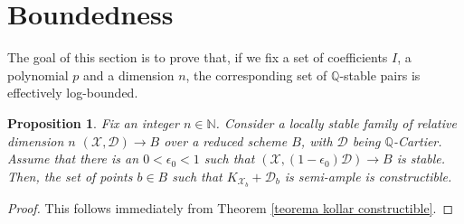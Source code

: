 \documentclass{amsart}
\newcommand{\bQ}{\mathbb{Q}}
\newcommand{\cD}{\mathcal{D}}
\newcommand{\cX}{\mathcal{X}}
\newtheorem{Prop}[theorem]{Proposition}
\theoremstyle{definition}
\begin{document}
\section{Boundedness}\label{section_boundedness}
The goal of this section is to prove that, if we fix a set of coefficients $I$, a polynomial $p$ and a dimension $n$, the corresponding set of $\bQ$-stable pairs is effectively log-bounded. 



\begin{Prop}\label{prop:nef:open}
Fix an integer $n\in \mathbb{N}$.
Consider a locally stable family of relative dimension $n$ $(\cX,\cD)\to B$ over a reduced scheme $B$, with $\cD$ being $\bQ$-Cartier.
Assume that there is an $0<\epsilon_0 < 1$ such that  $(\cX,(1-\epsilon_0)\cD)\to B$ is stable.
Then, the set of points $b\in B$ such that $K_{\cX_b} + \cD_b$ is semi-ample is constructible.
\end{Prop}

\begin{proof}
This follows immediately from Theorem \ref{teorema kollar constructible}.
\end{proof}
\end{document}
